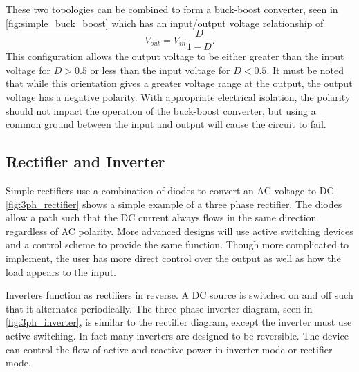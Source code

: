 

These two topologies can be combined to form a buck-boost converter, seen in \autoref{fig:simple_buck_boost} which has an input/output voltage relationship of 
\begin{equation}
V_{out} = V_{in}\frac{D}{1-D}. 
\end{equation}
This configuration allows the output voltage to be either greater than the input voltage for $D > 0.5$ or less than the input voltage for $D < 0.5$. It must be noted that while this orientation gives a greater voltage range at the output, the output voltage has a negative polarity. With appropriate electrical isolation, the polarity should not impact the operation of the buck-boost converter, but using a common ground between the input and output will cause the circuit to fail.



\subsection{Rectifier and Inverter}
Simple rectifiers use a combination of diodes to convert an AC voltage to DC. \autoref{fig:3ph_rectifier} shows a simple example of a three phase rectifier. The diodes allow a path such that the DC current always flows in the same direction regardless of AC polarity. More advanced designs will use active switching devices and a control scheme to provide the same function. Though more complicated to implement, the user has more direct control over the output as well as how the load appears to the input. 



Inverters function as rectifiers in reverse. A DC source is switched on and off such that it alternates periodically. The three phase inverter diagram, seen in \autoref{fig:3ph_inverter}, is similar to the rectifier diagram, except the inverter must use active switching. In fact many inverters are designed to be reversible. The device can control the flow of active and reactive power in inverter mode or rectifier mode.


